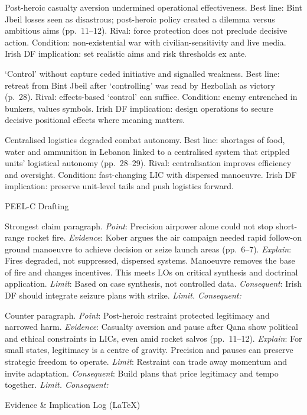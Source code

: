 Post-heroic casualty aversion undermined operational effectiveness.
Best line: Bint Jbeil losses seen as disastrous; post-heroic policy created a dilemma versus ambitious aims (pp.~11–12). Rival: force protection does not preclude decisive action. Condition: non-existential war with civilian-sensitivity and live media. Irish DF implication: set realistic aims and risk thresholds ex ante.

‘Control’ without capture ceded initiative and signalled weakness.
Best line: retreat from Bint Jbeil after ‘controlling’ was read by Hezbollah as victory (p.~28). Rival: effects-based ‘control’ can suffice. Condition: enemy entrenched in bunkers, values symbols. Irish DF implication: design operations to secure decisive positional effects where meaning matters.

Centralised logistics degraded combat autonomy.
Best line: shortages of food, water and ammunition in Lebanon linked to a centralised system that crippled units’ logistical autonomy (pp.~28–29). Rival: centralisation improves efficiency and oversight. Condition: fast-changing LIC with dispersed manoeuvre. Irish DF implication: preserve unit-level tails and push logistics forward.

PEEL-C Drafting

Strongest claim paragraph.
\textit{Point}: Precision airpower alone could not stop short-range rocket fire.
\textit{Evidence}: Kober argues the air campaign needed rapid follow-on ground manoeuvre to achieve decision or seize launch areas (pp.~6–7).
\textit{Explain}: Fires degraded, not suppressed, dispersed systems. Manoeuvre removes the base of fire and changes incentives. This meets LOs on critical synthesis and doctrinal application.
\textit{Limit}: Based on case synthesis, not controlled data.
\textit{Consequent}: Irish DF should integrate seizure plans with strike.
\textit{Limit. Consequent:}

Counter paragraph.
\textit{Point}: Post-heroic restraint protected legitimacy and narrowed harm.
\textit{Evidence}: Casualty aversion and pause after Qana show political and ethical constraints in LICs, even amid rocket salvos (pp.~11–12).
\textit{Explain}: For small states, legitimacy is a centre of gravity. Precision and pauses can preserve strategic freedom to operate.
\textit{Limit}: Restraint can trade away momentum and invite adaptation.
\textit{Consequent}: Build plans that price legitimacy and tempo together.
\textit{Limit. Consequent:}

Evidence & Implication Log (LaTeX)

